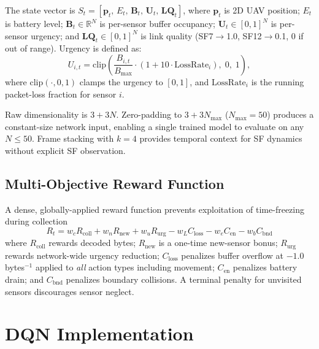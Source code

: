 \documentclass[conference]{IEEEtran}
\begin{document}
The state vector is $S_t = [\mathbf{p}_t,\, E_t,\, \mathbf{B}_t,\, \mathbf{U}_t,\, \mathbf{LQ}_t]$, where $\mathbf{p}_t$ is 2D UAV position; $E_t$ is battery level; $\mathbf{B}_t \in \mathbb{R}^N$ is per-sensor buffer occupancy; $\mathbf{U}_t \in [0,1]^N$ is per-sensor urgency; and $\mathbf{LQ}_t \in [0,1]^N$ is link quality (SF7$\to$1.0, SF12$\to$0.1, 0 if out of range). Urgency is defined as:
\begin{equation}
U_{i,t} = \mathrm{clip}\!\left(\frac{B_{i,t}}{B_{\max}} \cdot (1 + 10 \cdot \mathrm{LossRate}_i),\; 0,\; 1\right)
 ,
\label{eq:urgency}
\end{equation}
where $\mathrm{clip}(\cdot, 0, 1)$ clamps the urgency to $[0,1]$, and $\mathrm{LossRate}_i$ is the running packet-loss fraction for sensor $i$.

Raw dimensionality is $3 + 3N$. Zero-padding to $3 + 3N_{\max}$ ($N_{\max} = 50$) produces a constant-size network input, enabling a single trained model to evaluate on any $N \leq 50$. Frame stacking with $k = 4$ provides temporal context for SF dynamics without explicit SF observation.

\subsection{Multi-Objective Reward Function}

A dense, globally-applied reward function prevents exploitation of time-freezing during collection
\begin{equation}
R_t = w_c R_{\text{coll}} + w_n R_{\text{new}} + w_u R_{\text{urg}} - w_L C_{\text{loss}} - w_e C_{\text{en}} - w_b C_{\text{bnd}}
\label{eq:reward}
\end{equation}
where $R_{\text{coll}}$ rewards decoded bytes; $R_{\text{new}}$ is a one-time new-sensor bonus; $R_{\text{urg}}$ rewards network-wide urgency reduction; $C_{\text{loss}}$ penalizes buffer overflow at $-1.0$\,bytes$^{-1}$ applied to \emph{all} action types including movement; $C_{\text{en}}$ penalizes battery drain; and $C_{\text{bnd}}$ penalizes boundary collisions. A terminal penalty for unvisited sensors discourages sensor neglect.

\section{DQN Implementation}
\end{document}

